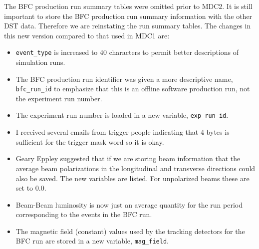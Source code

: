 The BFC production run summary tables were omitted prior to MDC2.  It is
still important to store the BFC production run summary information with
the other DST data.  Therefore we are reinstating the run summary tables.
The changes in this new version compared to that used in MDC1 are:
\begin{itemize}
\item
{\tt event\_type} is increased to 40 characters to permit better descriptions
of simulation runs.
\item
The BFC production run identifier was given a more descriptive name,
{\tt bfc\_run\_id} to emphasize that this is an offline software production
run, not the experiment run number.
\item
The  experiment run number is loaded in a new variable, {\tt exp\_run\_id}.
\item
I received several emails from trigger people indicating that 4 bytes is
sufficient for the trigger mask word so it is okay.
\item
Geary Eppley suggested that if we are storing beam information that the
average beam polarizations in the longitudinal and transverse directions
could also be saved.  The new variables are listed.  For unpolarized 
beams these are set to 0.0. 
\item
Beam-Beam luminosity is now just an average quantity for the run period
corresponding to the events in the BFC run.
\item
The magnetic field (constant) values used by the tracking detectors for
the BFC run are stored in a new variable, {\tt mag\_field}.
\end{itemize}

